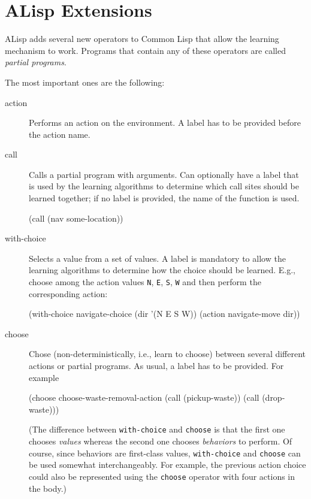 \documentclass[a4paper]{amsart}
\begin{document}
\section{ALisp Extensions}
\label{sec:alisp-extensions}

ALisp adds several new operators to Common Lisp that allow the
learning mechanism to work.  Programs that contain any of these
operators are called \emph{partial programs}.

The most important ones are the following:
\begin{description}
\item[action] Performs an action on the environment.  A label has to
  be provided before the action name.
\item[call] Calls a partial program with arguments.  Can optionally
  have a label that is used by the learning algorithms to determine
  which call sites should be learned together; if no label is
  provided, the name of the function is used.
  \begin{Code}
    (call (nav some-location))
  \end{Code}
\item[with-choice] Selects a value from a set of values.  A label is
  mandatory to allow the learning algorithms to determine how the
  choice should be learned.  E.g., choose among the action values
  \texttt{N}, \texttt{E}, \texttt{S}, \texttt{W} and then perform the
  corresponding action:
  \begin{Code}
    (with-choice navigate-choice (dir '(N E S W))
      (action navigate-move dir))
  \end{Code}
\item[choose] Chose (non-deterministically, i.e., learn to choose)
  between several different actions or partial programs.  As usual, a
  label has to be provided.  For example
  \begin{Code}
    (choose choose-waste-removal-action
            (call (pickup-waste))
            (call (drop-waste)))
  \end{Code}
  (The difference between \texttt{with-choice} and \texttt{choose} is
  that the first one chooses \emph{values} whereas the second one
  chooses \emph{behaviors} to perform.  Of course, since behaviors are
  first-class values, \texttt{with-choice} and \texttt{choose} can be
  used somewhat interchangeably.  For example, the previous action
  choice could also be represented using the \texttt{choose} operator
  with four actions in the body.)
\end{description}
\end{document}
